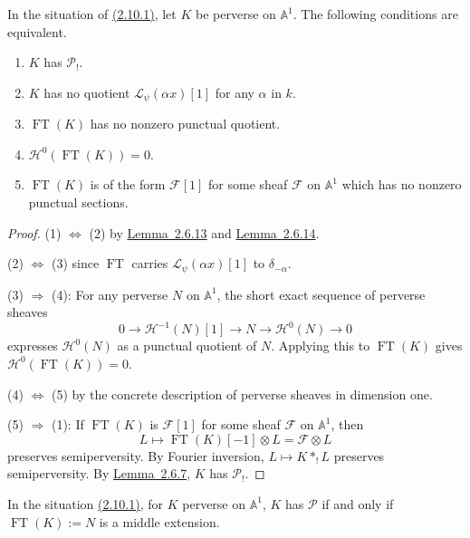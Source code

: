 In the situation of \hyperref[par:2.10.1]{(2.10.1)}, let \(K\) be perverse on \(\mathbb{A}^1\). The
following conditions are equivalent.
\begin{enumerate}[label=(\arabic*)]
\item \(K\) has \(\mathcal{P}_!\).
\item \(K\) has no quotient \(\mathcal{L}_\psi(\alpha x)[1]\) for any
\(\alpha\) in \(k\).
\item \(\operatorname{FT}(K)\) has no nonzero punctual quotient.
\item \(\mathcal{H}^0(\operatorname{FT}(K))=0\).
\item \(\operatorname{FT}(K)\) is of the form \(\mathcal{F}[1]\) for some
sheaf \(\mathcal{F}\) on \(\mathbb{A}^1\) which has no nonzero punctual
sections.
\end{enumerate}

\begin{proof}
(1) \(\Leftrightarrow\) (2) by \hyperref[lem:2.6.13]{Lemma~2.6.13} and \hyperref[lem:2.6.14]{Lemma~2.6.14}.

(2) \(\Leftrightarrow\) (3) since \(\operatorname{FT}\) carries
\(\mathcal{L}_\psi(\alpha x)[1]\) to \(\delta_{-\alpha}\).

(3) \(\Rightarrow\) (4): For any perverse \(N\) on \(\mathbb{A}^1\), the
short exact sequence of perverse sheaves
\[
  0\to\mathcal{H}^{-1}(N)[1]\to N\to\mathcal{H}^0(N)\to 0
\]
expresses \(\mathcal{H}^0(N)\) as a punctual quotient of \(N\). Applying this
to \(\operatorname{FT}(K)\) gives
\(\mathcal{H}^0(\operatorname{FT}(K))=0\).

(4) \(\Leftrightarrow\) (5) by the concrete description of perverse sheaves in
dimension one.

(5) \(\Rightarrow\) (1): If \(\operatorname{FT}(K)\) is \(\mathcal{F}[1]\) for
some sheaf \(\mathcal{F}\) on \(\mathbb{A}^1\), then
\[
  L\mapsto \operatorname{FT}(K)[-1]\otimes L=\mathcal{F}\otimes L
\]
preserves semiperversity. By Fourier inversion,
\(L\mapsto K*_!L\) preserves semiperversity. By \hyperref[lem:2.6.7]{Lemma~2.6.7}, \(K\) has
\(\mathcal{P}_!\).
\end{proof}

In the situation \hyperref[par:2.10.1]{(2.10.1)}, for \(K\) perverse on \(\mathbb{A}^1\), \(K\) has
\(\mathcal{P}\) if and only if \(\operatorname{FT}(K):=N\) is a middle
extension.


